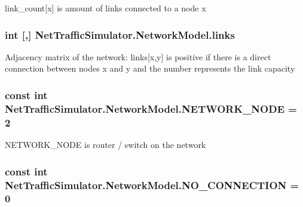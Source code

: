 link\-\_\-count\mbox{[}x\mbox{]} is amount of links connected to a node x \hypertarget{classNetTrafficSimulator_1_1NetworkModel_a3b9f06cc5ec93f59a6bf7e4042b70e48}{
\subsubsection[{links}]{\setlength{\rightskip}{0pt plus 5cm}int \mbox{[},\mbox{]} Net\-Traffic\-Simulator.\-Network\-Model.\-links\hspace{0.3cm}{\ttfamily [private]}}}\label{classNetTrafficSimulator_1_1NetworkModel_a3b9f06cc5ec93f59a6bf7e4042b70e48}
Adjacency matrix of the network\-: links\mbox{[}x,y\mbox{]} is positive if there is a direct connection between nodes x and y and the number represents the link capacity \hypertarget{classNetTrafficSimulator_1_1NetworkModel_ab2882fa4fe981780f78f822b12677f88}{
\subsubsection[{N\-E\-T\-W\-O\-R\-K\-\_\-\-N\-O\-D\-E}]{\setlength{\rightskip}{0pt plus 5cm}const int Net\-Traffic\-Simulator.\-Network\-Model.\-N\-E\-T\-W\-O\-R\-K\-\_\-\-N\-O\-D\-E = 2}}\label{classNetTrafficSimulator_1_1NetworkModel_ab2882fa4fe981780f78f822b12677f88}
N\-E\-T\-W\-O\-R\-K\-\_\-\-N\-O\-D\-E is router / switch on the network \hypertarget{classNetTrafficSimulator_1_1NetworkModel_a9e0ef364abc36d5bd8ebda5d703dc76b}{
\subsubsection[{N\-O\-\_\-\-C\-O\-N\-N\-E\-C\-T\-I\-O\-N}]{\setlength{\rightskip}{0pt plus 5cm}const int Net\-Traffic\-Simulator.\-Network\-Model.\-N\-O\-\_\-\-C\-O\-N\-N\-E\-C\-T\-I\-O\-N = 0\hspace{0.3cm}{\ttfamily [private]}}}\label{classNetTrafficSimulator_1_1NetworkModel_a9e0ef364abc36d5bd8ebda5d703dc76b}
